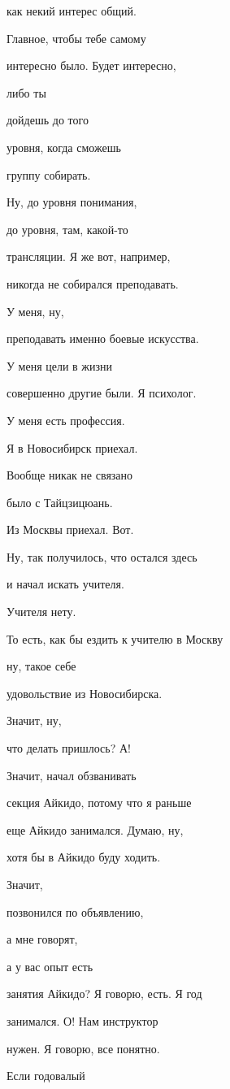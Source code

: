 как некий интерес общий.

Главное, чтобы тебе самому

интересно было. Будет интересно,

либо ты

дойдешь до того

уровня, когда сможешь

группу собирать.

Ну, до уровня понимания,

до уровня, там, какой-то

трансляции. Я же вот, например,

никогда не собирался преподавать.

У меня, ну,

преподавать именно боевые искусства.

У меня цели в жизни

совершенно другие были. Я психолог.

У меня есть профессия.

Я в Новосибирск приехал.

Вообще никак не связано

было с Тайцзицюань.

Из Москвы приехал. Вот.

Ну, так получилось, что остался здесь

и начал искать учителя.

Учителя нету.

То есть, как бы ездить к учителю в Москву

ну, такое себе

удовольствие из Новосибирска.

Значит, ну,

что делать пришлось? А!

Значит, начал обзванивать

секция Айкидо, потому что я раньше

еще Айкидо занимался. Думаю, ну,

хотя бы в Айкидо буду ходить.

Значит,

позвонился по объявлению,

а мне говорят,

а у вас опыт есть

занятия Айкидо? Я говорю, есть. Я год

занимался. О! Нам инструктор

нужен. Я говорю, все понятно.

Если годовалый

